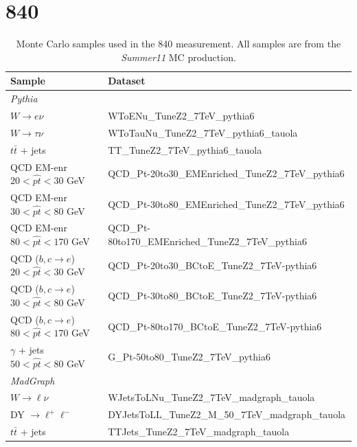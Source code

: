 \newpage
\section{\unit{840}{\invpb}}

\begin{table}[htbp]
\begin{center}
\small{
\begin{tabular}{ll}
\toprule
Sample & Dataset\\ %
\midrule
\multicolumn{2}{l}{\emph{Pythia}} \\ 
$W \rightarrow e \nu$
   & WToENu\_TuneZ2\_7TeV\_pythia6\\
$W \rightarrow \tau \nu$ 
   & WToTauNu\_TuneZ2\_7TeV\_pythia6\_tauola\\
$t\bar{t}$ + jets       
   & TT\_TuneZ2\_7TeV\_pythia6\_tauola\\
{QCD EM-enr}  $20<\hat{pt}<30$ GeV       
   & QCD\_Pt-20to30\_EMEnriched\_TuneZ2\_7TeV\_pythia6\\
{QCD EM-enr}  $30<\hat{pt}<80$  GeV     
   & QCD\_Pt-30to80\_EMEnriched\_TuneZ2\_7TeV\_pythia6\\
{QCD EM-enr}  $80<\hat{pt}<170$   GeV   
   & QCD\_Pt-80to170\_EMEnriched\_TuneZ2\_7TeV\_pythia6\\
{QCD ($b,c\rightarrow e$)}  $20<\hat{pt}<30$ GeV 
   & QCD\_Pt-20to30\_BCtoE\_TuneZ2\_7TeV-pythia6\\
{QCD ($b,c\rightarrow e$)}  $30<\hat{pt}<80$ GeV 
   & QCD\_Pt-30to80\_BCtoE\_TuneZ2\_7TeV-pythia6\\
{QCD ($b,c\rightarrow e$)}  $80<\hat{pt}<170$ GeV 
   & QCD\_Pt-80to170\_BCtoE\_TuneZ2\_7TeV-pythia6\\
{$\gamma$ + jets  } $50 <\hat{pt} < 80$ GeV       
   & G\_Pt-50to80\_TuneZ2\_7TeV\_pythia6\\
\multicolumn{2}{l}{\emph{MadGraph}} \\ 
$W \rightarrow \ell \nu$ 
   & WJetsToLNu\_TuneZ2\_7TeV\_madgraph\_tauola\\
DY $\rightarrow \ell^+\ell^-$	 
   & DYJetsToLL\_TuneZ2\_M\_50\_7TeV\_madgraph\_tauola\\
$t\bar{t}$ + jets        
   & TTJets\_TuneZ2\_7TeV\_madgraph\_tauola\\
\bottomrule
\end{tabular}
}
\caption{\label{tab:samples840}Monte Carlo samples used in the
\unit{840}{\invpb} measurement. All samples are from the
\emph{Summer11} MC production. }
\end{center}
\end{table}
